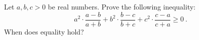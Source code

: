 Let $a,b,c > 0$ be real numbers. Prove the following inequality:
$$a^2\cdot\frac{a-b}{a+b}+b^2\cdot\frac{b-c}{b+c}+c^2\cdot\frac{c-a}{c+a} \ge 0\ .$$
When does equality hold?